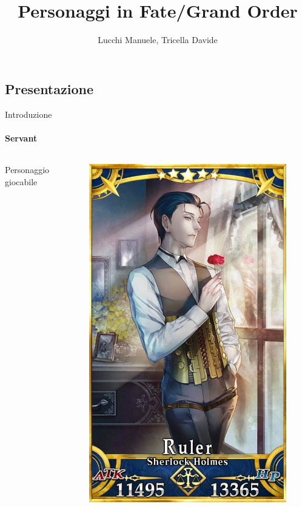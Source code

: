 \documentclass{beamer}
\title{Personaggi in Fate/Grand Order} %
\author{Lucchi Manuele, Tricella Davide}
\begin{document}
\frame[c]{\maketitle}

\begin{darkframes}

  \section{Presentazione}

  \begin{frame}{Introduzione}
    \framesubtitle{Servant}
    \begin{columns}
      \begin{column}{0.5\textwidth}
        Personaggio giocabile
      \end{column}
      \begin{column}{0.5\textwidth}
        \begin{figure}
          \centering
          \includegraphics[height=0.65\textheight]{./images/servant.png}

\end{figure}
\end{column}
\end{columns}
\end{frame}
\end{darkframes}
\end{document}
